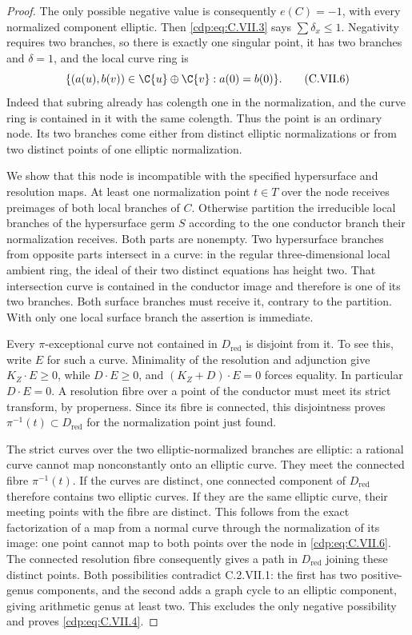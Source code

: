 \begin{proof}
The only possible negative value is consequently
$e(C)=-1$, with every normalized component elliptic.
Then \eqref{cdp:eq:C.VII.3} says $\sum\delta_x\le1$.
Negativity requires two branches, so there is exactly
one singular point, it has two branches and
$\delta=1$, and the local curve ring is
\[
 \{(a(u),b(v))\in\C\{u\}\oplus\C\{v\}:a(0)=b(0)\}.
\tag{C.VII.6}\label{cdp:eq:C.VII.6}
\]
Indeed that subring already has colength one in the
normalization, and the curve ring is contained in it
with the same colength. Thus the point is an ordinary
node. Its two branches come either from distinct
elliptic normalizations or from two distinct points
of one elliptic normalization.

We show that this node is incompatible with the
specified hypersurface and resolution maps. At least
one normalization point $t\in T$ over the node receives
preimages of both local branches of $C$.
Otherwise partition the irreducible local branches
of the hypersurface germ $S$ according to the one
conductor branch their normalization receives. Both
parts are nonempty. Two hypersurface branches from
opposite parts intersect in a curve: in the regular
three-dimensional local ambient ring, the ideal of
their two distinct equations has height two.
That intersection curve is contained in the conductor
image and therefore is one of its two branches.
Both surface branches must receive it, contrary to
the partition. With only one local surface branch
the assertion is immediate.

Every $\pi$-exceptional curve not contained in
$D_{\mathrm{red}}$ is disjoint from it. To see this,
write $E$ for such a curve. Minimality of the
resolution and adjunction give $K_Z\cdot E\ge0$,
while $D\cdot E\ge0$, and
$(K_Z+D)\cdot E=0$ forces equality. In particular
$D\cdot E=0$. A resolution fibre over a point of
the conductor must meet its strict transform, by
properness. Since its fibre is connected, this
disjointness proves
$\pi^{-1}(t)\subset D_{\mathrm{red}}$ for the
normalization point just found.

The strict curves over the two elliptic-normalized
branches are elliptic: a rational curve cannot map
nonconstantly onto an elliptic curve. They meet the
connected fibre $\pi^{-1}(t)$. If the curves are
distinct, one connected component of $D_{\mathrm{red}}$
therefore contains two elliptic curves. If they are
the same elliptic curve, their meeting points with
the fibre are distinct. This follows from the exact
factorization of a map from a normal curve through
the normalization of its image: one point cannot
map to both points over the node in \eqref{cdp:eq:C.VII.6}.
The connected resolution fibre consequently gives
a path in $D_{\mathrm{red}}$ joining these distinct
points. Both possibilities contradict C.2.VII.1:
the first has two positive-genus components, and
the second adds a graph cycle to an elliptic
component, giving arithmetic genus at least two.
This excludes the only negative possibility and
proves \eqref{cdp:eq:C.VII.4}.
\end{proof}


